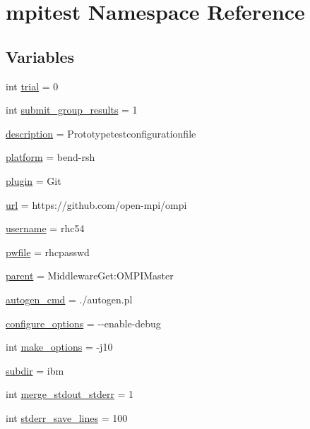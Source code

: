 \hypertarget{namespacempitest}{\section{mpitest Namespace Reference}
\label{namespacempitest}
}
\subsection*{Variables}
\begin{DoxyCompactItemize}
\item 
int \hyperlink{namespacempitest_aa0f43e6283b3889679e6631336f043d1}{trial} = 0
\item 
int \hyperlink{namespacempitest_ac471d6a27e0973ff2ca6b08b1709963d}{submit\-\_\-group\-\_\-results} = 1
\item 
\hyperlink{namespacempitest_ab3988561c8669a528d164bb087dfaba8}{description} = Prototypetestconfigurationfile
\item 
\hyperlink{namespacempitest_aa707f637f52c6a7d6e9269de9fa926d3}{platform} = bend-\/rsh
\item 
\hyperlink{namespacempitest_ad3586f81f11a42b438f3a012d4c2bf4e}{plugin} = Git
\item 
\hyperlink{namespacempitest_aae573db72acd85d3ee46589c81be2d37}{url} = https\-://github.\-com/open-\/mpi/ompi
\item 
\hyperlink{namespacempitest_a862f2676bbe33c7059e3a136b4b96ddc}{username} = rhc54
\item 
\hyperlink{namespacempitest_a4d126335ef307f44645da8ff58e86927}{pwfile} = rhcpasswd
\item 
\hyperlink{namespacempitest_afea79525dcdc90bf190e1fd794ba7377}{parent} = Middleware\-Get\-:\-O\-M\-P\-I\-Master
\item 
\hyperlink{namespacempitest_a216b951ce28d23d25761486f09fdafa5}{autogen\-\_\-cmd} = ./autogen.\-pl
\item 
\hyperlink{namespacempitest_ac530ff92b31cfd595a3fc3c3a82d7fc6}{configure\-\_\-options} = -\/-\/enable-\/debug
\item 
int \hyperlink{namespacempitest_a59b1db518516dae2b5daace949760505}{make\-\_\-options} = -\/j10
\item 
\hyperlink{namespacempitest_adb11b85868ea4bb66346873247ae5eee}{subdir} = ibm
\item 
int \hyperlink{namespacempitest_a458e434e47470db96ce5fd267a120b69}{merge\-\_\-stdout\-\_\-stderr} = 1
\item 
int \hyperlink{namespacempitest_a359e155a689c5604a331d2450976d0fa}{stderr\-\_\-save\-\_\-lines} = 100

\end{DoxyCompactItemize}
